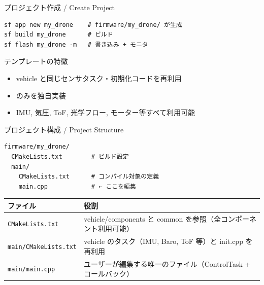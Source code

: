 \begin{frame}[fragile]{プロジェクト作成 / Create Project}
  \begin{lstlisting}[style=sfbash]
sf app new my_drone    # firmware/my_drone/ が生成
sf build my_drone      # ビルド
sf flash my_drone -m   # 書き込み + モニタ
  \end{lstlisting}

  \vspace{0.5em}

  \begin{block}{テンプレートの特徴}
    \begin{itemize}
      \item vehicle と同じセンサタスク・初期化コードを再利用
      \item {} のみを独自実装
      \item IMU, 気圧, ToF, 光学フロー, モーター等すべて利用可能
    \end{itemize}
  \end{block}
\end{frame}

\begin{frame}[fragile]{プロジェクト構成 / Project Structure}
  \begin{lstlisting}[style=sfbash, basicstyle=\ttfamily\small]
firmware/my_drone/
  CMakeLists.txt        # ビルド設定
  main/
    CMakeLists.txt      # コンパイル対象の定義
    main.cpp            # ← ここを編集
  \end{lstlisting}

  \vspace{0.3em}

  {\footnotesize
  \begin{tabular}{ll}
    \hline
    \textbf{ファイル} & \textbf{役割} \\
    \hline
    \texttt{CMakeLists.txt}      & vehicle/components と common を参照（全コンポーネント利用可能） \\
    \texttt{main/CMakeLists.txt} & vehicle のタスク（IMU, Baro, ToF 等）と init.cpp を再利用 \\
    \texttt{main/main.cpp}       & ユーザーが編集する唯一のファイル（ControlTask + コールバック） \\
    \hline
  \end{tabular}
  }
\end{frame}

